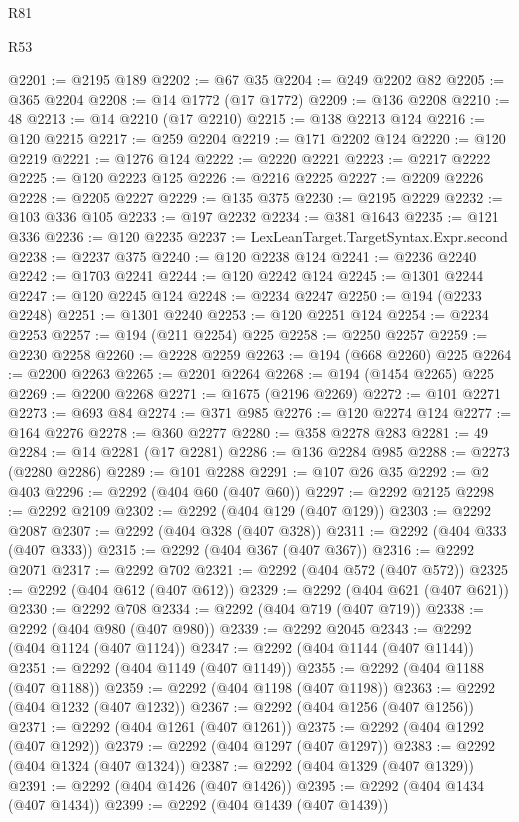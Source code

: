 \begin{lexlean}{R81}
\begin{lexlean}{R53}
\begin{coremodule}
{{{{{{{{{{{{{{{{{{{{{{{{{{{{{{{{{{{{{{{{{{{{{{{{{{{{{{{{{{{{{{{{{{{{{{{{{{{{{{{{{{{{{{{{{{{{{{{{{{{{{{{{{{{{{{{{@2201 := @2195 @189
@2202 := @67 @35
@2204 := @249 @2202 @82
@2205 := @365 @2204
@2208 := @14 @1772 (@17 @1772)
@2209 := @136 @2208
@2210 := 48
@2213 := @14 @2210 (@17 @2210)
@2215 := @138 @2213 @124
@2216 := @120 @2215
@2217 := @259 @2204
@2219 := @171 @2202 @124
@2220 := @120 @2219
@2221 := @1276 @124
@2222 := @2220 @2221
@2223 := @2217 @2222
@2225 := @120 @2223 @125
@2226 := @2216 @2225
@2227 := @2209 @2226
@2228 := @2205 @2227
@2229 := @135 @375
@2230 := @2195 @2229
@2232 := @103 @336 @105
@2233 := @197 @2232
@2234 := @381 @1643
@2235 := @121 @336
@2236 := @120 @2235
@2237 := LexLeanTarget.TargetSyntax.Expr.second
@2238 := @2237 @375
@2240 := @120 @2238 @124
@2241 := @2236 @2240
@2242 := @1703 @2241
@2244 := @120 @2242 @124
@2245 := @1301 @2244
@2247 := @120 @2245 @124
@2248 := @2234 @2247
@2250 := @194 (@2233 @2248)
@2251 := @1301 @2240
@2253 := @120 @2251 @124
@2254 := @2234 @2253
@2257 := @194 (@211 @2254) @225
@2258 := @2250 @2257
@2259 := @2230 @2258
@2260 := @2228 @2259
@2263 := @194 (@668 @2260) @225
@2264 := @2200 @2263
@2265 := @2201 @2264
@2268 := @194 (@1454 @2265) @225
@2269 := @2200 @2268
@2271 := @1675 (@2196 @2269)
@2272 := @101 @2271
@2273 := @693 @84
@2274 := @371 @985
@2276 := @120 @2274 @124
@2277 := @164 @2276
@2278 := @360 @2277
@2280 := @358 @2278 @283
@2281 := 49
@2284 := @14 @2281 (@17 @2281)
@2286 := @136 @2284 @985
@2288 := @2273 (@2280 @2286)
@2289 := @101 @2288
@2291 := @107 @26 @35
@2292 := @2 @403
@2296 := @2292 (@404 @60 (@407 @60))
@2297 := @2292 @2125
@2298 := @2292 @2109
@2302 := @2292 (@404 @129 (@407 @129))
@2303 := @2292 @2087
@2307 := @2292 (@404 @328 (@407 @328))
@2311 := @2292 (@404 @333 (@407 @333))
@2315 := @2292 (@404 @367 (@407 @367))
@2316 := @2292 @2071
@2317 := @2292 @702
@2321 := @2292 (@404 @572 (@407 @572))
@2325 := @2292 (@404 @612 (@407 @612))
@2329 := @2292 (@404 @621 (@407 @621))
@2330 := @2292 @708
@2334 := @2292 (@404 @719 (@407 @719))
@2338 := @2292 (@404 @980 (@407 @980))
@2339 := @2292 @2045
@2343 := @2292 (@404 @1124 (@407 @1124))
@2347 := @2292 (@404 @1144 (@407 @1144))
@2351 := @2292 (@404 @1149 (@407 @1149))
@2355 := @2292 (@404 @1188 (@407 @1188))
@2359 := @2292 (@404 @1198 (@407 @1198))
@2363 := @2292 (@404 @1232 (@407 @1232))
@2367 := @2292 (@404 @1256 (@407 @1256))
@2371 := @2292 (@404 @1261 (@407 @1261))
@2375 := @2292 (@404 @1292 (@407 @1292))
@2379 := @2292 (@404 @1297 (@407 @1297))
@2383 := @2292 (@404 @1324 (@407 @1324))
@2387 := @2292 (@404 @1329 (@407 @1329))
@2391 := @2292 (@404 @1426 (@407 @1426))
@2395 := @2292 (@404 @1434 (@407 @1434))
@2399 := @2292 (@404 @1439 (@407 @1439))
}}}}}}}}}}}}}}}}}}}}}}}}}}}}}}}}}}}}}}}}}}}}}}}}}}}}}}}}}}}}}}}}}}}}}}}}}}}}}}}}}}}}}}}}}}}}}}}}}}}}}}}}}}}}}}}}
\end{coremodule}
\end{lexlean}
\end{lexlean}
